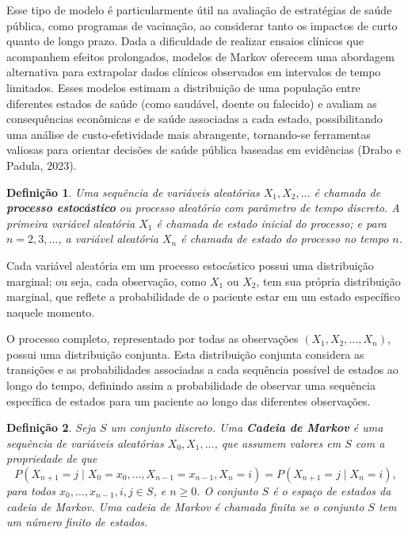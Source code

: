 \documentclass[12pt]{article}
\theoremstyle{break}
\newtheorem{definition}{Definição}[section]
\begin{document}
Esse tipo de modelo é particularmente útil na avaliação de estratégias de saúde pública, como programas de vacinação, ao considerar tanto os impactos de curto quanto de longo prazo. Dada a dificuldade de realizar ensaios clínicos que acompanhem efeitos prolongados, modelos de Markov oferecem uma abordagem alternativa para extrapolar dados clínicos observados em intervalos de tempo limitados. Esses modelos estimam a distribuição de uma população entre diferentes estados de saúde (como saudável, doente ou falecido) e avaliam as consequências econômicas e de saúde associadas a cada estado, possibilitando uma análise de custo-efetividade mais abrangente, tornando-se ferramentas valiosas para orientar decisões de saúde pública baseadas em evidências (Drabo e Padula, 2023).






\begin{definition}
Uma sequência de variáveis aleatórias \( X_1, X_2, \dots \) é chamada de \textbf{processo estocástico} ou \textit{processo aleatório} com parâmetro de tempo discreto.  A primeira variável aleatória \( X_1 \) é chamada de \textit{estado inicial} do processo; e para \( n = 2, 3, \dots \), a variável aleatória \( X_n \) é chamada de \textit{estado do processo no tempo \( n \)}. 
\end{definition}


Cada variável aleatória em um processo estocástico possui uma distribuição marginal; ou seja, cada observação, como \( X_1 \) ou \( X_2 \), tem sua própria distribuição marginal, que reflete a probabilidade de o paciente estar em um estado específico naquele momento.

O processo completo, representado por todas as observações \( (X_1, X_2, \dots, X_n) \), possui uma distribuição conjunta. Esta distribuição conjunta considera as transições e as probabilidades associadas a cada sequência possível de estados ao longo do tempo, definindo assim a probabilidade de observar uma sequência específica de estados para um paciente ao longo das diferentes observações.






\begin{definition}{}
Seja \( S \) um conjunto discreto. Uma \textbf{Cadeia de Markov} é uma sequência de variáveis aleatórias \( X_0, X_1, \dots \), que assumem valores em \( S \) com a propriedade de que
\[
P(X_{n+1} = j \mid X_0 = x_0, \dots, X_{n-1} = x_{n-1}, X_n = i) = P(X_{n+1} = j \mid X_n = i),
\]
para todos \( x_0, \dots, x_{n-1}, i, j \in S \), e \( n \geq 0 \). O conjunto \( S \) é o espaço de estados da cadeia de Markov. Uma cadeia de Markov é chamada finita se o conjunto $S$ tem um número finito de estados.
\end{definition}
\end{document}
